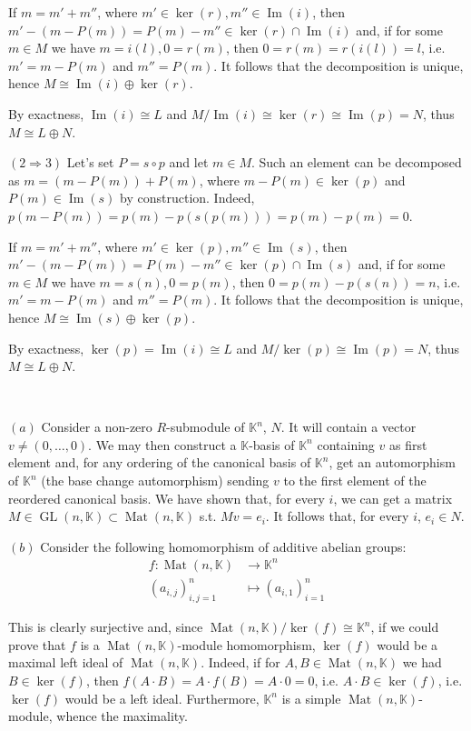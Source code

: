 \documentclass{article}
\newcommand{\numberset}{\mathbb}
\newcommand{\K}{\numberset{K}}
\newcommand{\exercise}[1]{\noindent {\bf Exercise #1}}
\DeclareMathOperator{\Ima}{Im}
\DeclareMathOperator{\GL}{GL}
\DeclareMathOperator{\Mat}{Mat}
\begin{document}
If $m=m'+m''$, where $m'\in\ker(r), m''\in\Ima(i)$, then $m'-(m-P(m))=P(m)-m''\in
\ker(r)\cap\Ima(i)$ and, if for some $m\in M$ we have $m=i(l), 0=r(m)$, then
$0=r(m)=r(i(l))=l$, i.e. $m'=m-P(m)$ and $m''=P(m)$. It follows that the 
decomposition is unique, hence $M\cong \Ima(i)\oplus\ker(r)$. 

By exactness, $\Ima(i)\cong L$ and $M/\Ima(i)\cong\ker(r)\cong\Ima(p)=N$, thus 
$M\cong L\oplus N$.

$(2\Rightarrow 3)$ Let's set $P=s\circ p$ and let $m\in M$. Such an element can be 
decomposed as $m=(m-P(m))+P(m)$, where $m-P(m)\in\ker(p)$ and $P(m)\in\Ima(s)$ 
by construction. Indeed, $p(m-P(m))=p(m)-p(s(p(m)))=p(m)-p(m)=0$.

If $m=m'+m''$, where $m'\in\ker(p), m''\in\Ima(s)$, then $m'-(m-P(m))=P(m)-m''\in
\ker(p)\cap\Ima(s)$ and, if for some $m\in M$ we have $m=s(n), 0=p(m)$, then
$0=p(m)-p(s(n))=n$, i.e. $m'=m-P(m)$ and $m''=P(m)$. It follows that the
decomposition is unique, hence $M\cong \Ima(s)\oplus\ker(p)$.

By exactness, $\ker(p)=\Ima(i)\cong L$ and $M/\ker(p)\cong\Ima(p)=N$, thus 
$M\cong L\oplus N$.


~\\
\exercise{2.10}

$(a)$ Consider a non-zero $R$-submodule of $\K^n$, $N$. It will contain a vector 
$v\neq (0,\ldots,0)$. We may then construct a $\K$-basis of $\K^n$ containing $v$
as first element and, for any ordering of the canonical basis of $\K^n$, get an 
automorphism of $\K^n$  (the base change automorphism) sending $v$ to the first 
element of the reordered canonical basis. We have shown that, for every $i$, we 
can get a matrix $M\in\GL(n,\K)\subset\Mat(n,\K)$ s.t. $Mv=e_i$. It follows 
that, for every $i$, $e_i\in N$.

$(b)$ Consider the following homomorphism of additive abelian groups:
\begin{align*}
    f: \Mat(n,\K) &\rightarrow \K^n \\
    (a_{i,j})_{i,j=1}^n &\mapsto (a_{i,1})_{i=1}^n
\end{align*}

This is clearly surjective and, since $\Mat(n,\K)/\ker(f)\cong\K^n$, if we could
prove that $f$ is a $\Mat(n,\K)$-module homomorphism, $\ker(f)$ would be a 
maximal left ideal of $\Mat(n,\K)$. Indeed, if for $A,B\in\Mat(n,\K)$ we had 
$B\in\ker(f)$, then $f(A\cdot B)=A\cdot f(B)=A\cdot 0=0$, i.e. $A\cdot B\in\ker(f)$,
i.e. $\ker(f)$ would be a left ideal. Furthermore, $\K^n$ is a simple 
$\Mat(n,\K)$-module, whence the maximality.
\end{document}
